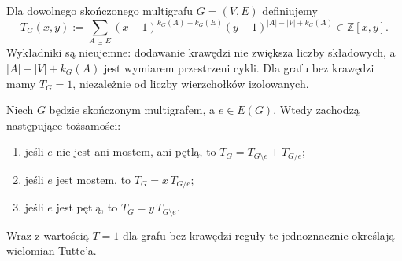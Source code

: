 \begin{definicja}
\label{def:tg-tutte}
Dla dowolnego skończonego multigrafu $G=(V,E)$ definiujemy
\[
T_G(x,y):=\sum_{A\subseteq E}
 (x-1)^{k_G(A)-k_G(E)}
 (y-1)^{|A|-|V|+k_G(A)}\in\mathbb Z[x,y].
\]
Wykładniki są nieujemne: dodawanie krawędzi nie zwiększa liczby
składowych, a $|A|-|V|+k_G(A)$ jest wymiarem przestrzeni cykli.
Dla grafu bez krawędzi mamy $T_G=1$, niezależnie od liczby
wierzchołków izolowanych.
\end{definicja}

\begin{twierdzenie}
\label{thm:tg-tutte-recursion}
Niech $G$ będzie skończonym multigrafem, a $e\in E(G)$.
Wtedy zachodzą następujące tożsamości:
\begin{enumerate}[label=(\roman*)]
\item jeśli $e$ nie jest ani mostem, ani pętlą, to
$T_G=T_{G\setminus e}+T_{G/e}$;
\item jeśli $e$ jest mostem, to $T_G=x\,T_{G/e}$;
\item jeśli $e$ jest pętlą, to $T_G=y\,T_{G\setminus e}$.
\end{enumerate}
Wraz z wartością $T=1$ dla grafu bez krawędzi reguły te
jednoznacznie określają wielomian Tutte'a.
\end{twierdzenie}

